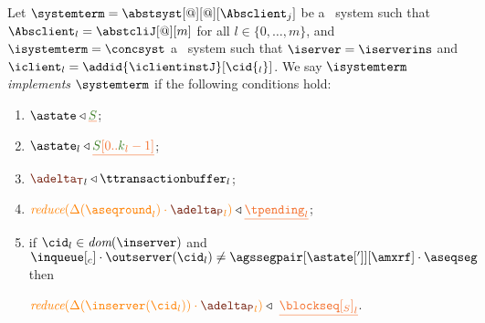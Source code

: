 \begin{definition} \label{def:implementation}
Let  $\systemterm = \abstsyst[@][@][\Absclient_j]$ be a \tgspcalculus\ system
 such that $\Absclient_l={\abstcliJ[@][m]}$ for all
$l\in\{0,\ldots,m\}$, and  $\isystemterm = \concsyst$  a \igsp\  system such that  $\iserver = \iserverins$ and $\iclient_l = \addid{\iclientinstJ}[{\cid{_l}}]$.
 We say {\em $\isystemterm$ implements $\systemterm$} if the following conditions hold:


\newpage

\begin{enumerate}
	\item \label{prop_stateserver} $\astate \triangleleft \flatten{\queuemessage}$;

	\item \label{prop_state_known} $\astate_l \triangleleft \flatten {\queuemessage[0 .. \tknown_l - 1]}$;
	
	\item \label{prop_transactions} ${\transactionbuffer}_l\triangleleft{\ttransactionbuffer}_l$;
	
	\item \label{prop_pending}  
		$\ireduce{\igetdeltas{\pending_l}\cdot {\pushbuffer}_l} \triangleleft \flatten{\tpending_l}$;


	\item \label{prop_sent}  
	   
	   if $\cid_l \in \dom\inserver$ and $\inclient \cdot\outserver(\cid_l) \neq \agssegpair[{\astate[']}][{\amxrf}]\cdot\aseqseg$ %
	   then 
	   
	   $ \ireduce{\igetdeltas{\inserver(\cid_l)}\cdot {\pushbuffer}_l} \triangleleft \ \flatten{{\tsent}_l}$. 
	 


\end{enumerate}
\end{definition}
